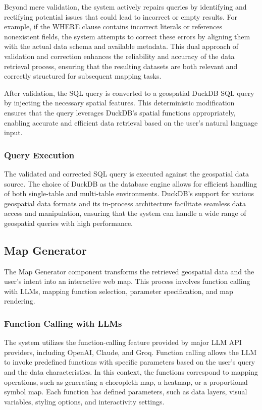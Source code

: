 Beyond mere validation, the system actively repairs queries by identifying and rectifying potential issues that could lead to incorrect or empty results. For example, if the WHERE clause contains incorrect literals or references nonexistent fields, the system attempts to correct these errors by aligning them with the actual data schema and available metadata. This dual approach of validation and correction enhances the reliability and accuracy of the data retrieval process, ensuring that the resulting datasets are both relevant and correctly structured for subsequent mapping tasks.

After validation, the SQL query is converted to a geospatial DuckDB SQL query by injecting the necessary spatial features. This deterministic modification ensures that the query leverages DuckDB's spatial functions appropriately, enabling accurate and efficient data retrieval based on the user's natural language input.

\subsubsection{Query Execution}
The validated and corrected SQL query is executed against the geospatial data source. The choice of DuckDB as the database engine allows for efficient handling of both single-table and multi-table environments. DuckDB's support for various geospatial data formats and its in-process architecture facilitate seamless data access and manipulation, ensuring that the system can handle a wide range of geospatial queries with high performance.

\subsection{Map Generator}
The Map Generator component transforms the retrieved geospatial data and the user's intent into an interactive web map. This process involves function calling with LLMs, mapping function selection, parameter specification, and map rendering.

\subsubsection{Function Calling with LLMs}
The system utilizes the function-calling feature provided by major LLM API providers, including OpenAI, Claude, and Groq. Function calling allows the LLM to invoke predefined functions with specific parameters based on the user's query and the data characteristics. In this context, the functions correspond to mapping operations, such as generating a choropleth map, a heatmap, or a proportional symbol map. Each function has defined parameters, such as data layers, visual variables, styling options, and interactivity settings.

